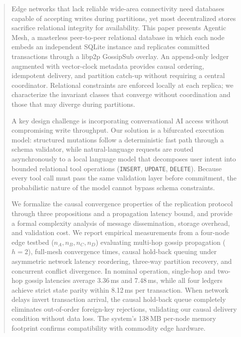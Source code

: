 \maketitle

\begin{abstract}
Edge networks that lack reliable wide-area connectivity need databases capable of accepting writes during partitions, yet most decentralized stores sacrifice relational integrity for availability. This paper presents Agentic Mesh, a masterless peer-to-peer relational database in which each node embeds an independent SQLite instance and replicates committed transactions through a libp2p GossipSub overlay. An append-only ledger augmented with vector-clock metadata provides causal ordering, idempotent delivery, and partition catch-up without requiring a central coordinator. Relational constraints are enforced locally at each replica; we characterize the invariant classes that converge without coordination and those that may diverge during partitions.

A key design challenge is incorporating conversational AI access without compromising write throughput. Our solution is a bifurcated execution model: structured mutations follow a deterministic fast path through a schema validator, while natural-language requests are routed asynchronously to a local language model that decomposes user intent into bounded relational tool operations (\texttt{INSERT}, \texttt{UPDATE}, \texttt{DELETE}). Because every tool call must pass the same validation layer before commitment, the probabilistic nature of the model cannot bypass schema constraints.

We formalize the causal convergence properties of the replication protocol through three propositions and a propagation latency bound, and provide a formal complexity analysis of message dissemination, storage overhead, and validation cost. We report empirical measurements from a four-node edge testbed ($n_A, n_B, n_C, n_D$) evaluating multi-hop gossip propagation ($h=2$), full-mesh convergence times, causal hold-back queuing under asymmetric network latency reordering, three-way partition recovery, and concurrent conflict divergence. In nominal operation, single-hop and two-hop gossip latencies average 3.36\,ms and 7.48\,ms, while all four ledgers achieve strict state parity within 8.12\,ms per transaction. When network delays invert transaction arrival, the causal hold-back queue completely eliminates out-of-order foreign-key rejections, validating our causal delivery condition without data loss. The system's 138\,MB per-node memory footprint confirms compatibility with commodity edge hardware.
\end{abstract}


